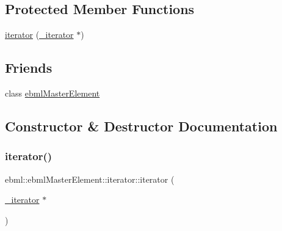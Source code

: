 \subsection*{Protected Member Functions}
\begin{DoxyCompactItemize}
\item 
\mbox{\hyperlink{classebml_1_1ebmlMasterElement_1_1iterator_af3851f8e35252a05f89d55f76fb40e7d}{iterator}} (\mbox{\hyperlink{classebml_1_1ebmlMasterElement_1_1__iterator}{\+\_\+iterator}} $\ast$)
\end{DoxyCompactItemize}
\subsection*{Friends}
\begin{DoxyCompactItemize}
\item 
class \mbox{\hyperlink{classebml_1_1ebmlMasterElement_1_1iterator_ad88e86cba72e9332a4693c1c6009b281}{ebml\+Master\+Element}}
\end{DoxyCompactItemize}


\subsection{Constructor \& Destructor Documentation}
\mbox{\label{classebml_1_1ebmlMasterElement_1_1iterator_af3851f8e35252a05f89d55f76fb40e7d}} 
\subsubsection{\texorpdfstring{iterator()}{iterator()}\hspace{0.1cm}{\footnotesize\ttfamily [1/3]}}
{\footnotesize\ttfamily ebml\+::ebml\+Master\+Element\+::iterator\+::iterator (\begin{DoxyParamCaption}\item[{\mbox{\hyperlink{classebml_1_1ebmlMasterElement_1_1__iterator}{\+\_\+iterator}} $\ast$}]{ }\end{DoxyParamCaption})\hspace{0.3cm}{\ttfamily [protected]}}

\mbox{\label{classebml_1_1ebmlMasterElement_1_1iterator_aff65b96ef2b667cd5044d594da574d79}} 
